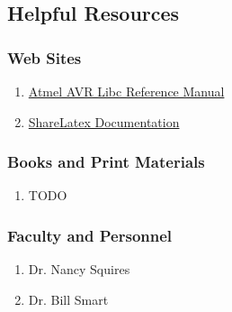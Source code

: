 \subsection{Helpful Resources}
\subsubsection{Web Sites}
\begin{enumerate}
\item{\href{http://www.atmel.com/webdoc/avrlibcreferencemanual/}{Atmel AVR Libc Reference Manual}}
\item{\href{https://www.sharelatex.com/learn/}{ShareLatex Documentation}}
\end{enumerate}

\subsubsection{Books and Print Materials}
\begin{enumerate}
\item{TODO}
\end{enumerate}

\subsubsection{Faculty and Personnel}
\begin{enumerate}
\item{Dr. Nancy Squires}
\item{Dr. Bill Smart}
\end{enumerate}
